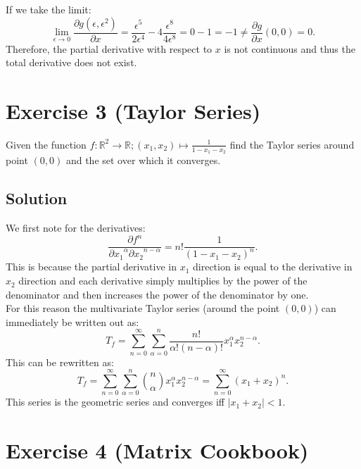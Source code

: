 \documentclass[10pt]{article}
\numberwithin{equation}{section}
\begin{document}
\begin{enumerate}
{If we take the limit:
$$
\lim_{\epsilon \to 0} \frac{\partial g(\epsilon, \epsilon^2)}{\partial x} = \frac{\epsilon^5}{2\epsilon^4} - 4 \frac{\epsilon^8}{4 \epsilon^8} = 0 - 1 = -1 \neq \frac{\partial g}{\partial x} (0, 0) = 0.
$$
Therefore, the partial derivative with respect to $x$ is not continuous and thus the total derivative does not exist. 
}

\end{enumerate}

\section*{Exercise 3 (Taylor Series)}
Given the function $f: \mathbb{R}^2 \to \mathbb{R}; (x_1, x_2) \mapsto \frac{1}{1-x_1-x_2}$ find the Taylor series around point $(0, 0)$ and the set over which it converges. 
\subsection*{Solution}
We first note for the derivatives:
$$
\frac{\partial f^n}{{\partial x_1}^\alpha{\partial x_2}^{n-\alpha}} = n! \frac{1}{{(1 - x_1 - x_2)}^n}.  
$$
This is because the partial derivative in $x_1$ direction is equal to the derivative in $x_2$ direction and each derivative simply multiplies by the power of the denominator and then increases the power of the denominator by one. \\
For this reason the multivariate Taylor series (around the point $(0, 0)$) can immediately be written out as:
$$
T_f = \sum_{n=0}^\infty \sum_{\alpha=0}^n \frac{n!}{\alpha! (n-\alpha)!}x_1^\alpha x_2^{n-\alpha}.
$$
This can be rewritten as:
$$
T_f = \sum_{n=0}^\infty \sum_{\alpha=0}^n \binom{n}{\alpha} x_1^\alpha x_2^{n-\alpha} = \sum_{n=0}^\infty (x_1 + x_2)^n.
$$
This series is the geometric series and converges iff $|x_1 + x_2| < 1$.  
\section*{Exercise 4 (Matrix Cookbook)}
\end{document}
